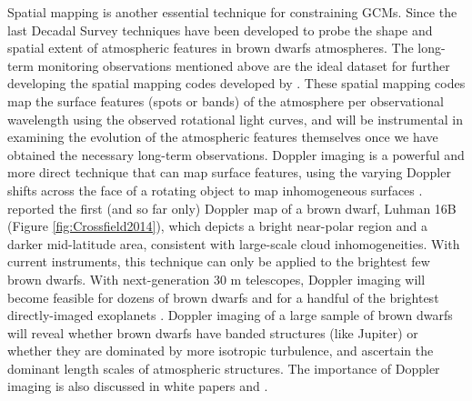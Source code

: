 \documentclass[12pt]{article}
\begin{document}
\begin{justify}
\noindent Spatial mapping is another essential technique for constraining GCMs. Since the last Decadal Survey techniques have been developed to probe the shape and spatial extent of atmospheric features in brown dwarfs atmospheres. The long-term monitoring observations mentioned above are the ideal dataset for further developing the spatial mapping codes developed by \citep{Karalidi2015, Karalidi2016, Apai2017a}. These spatial mapping codes map the surface features (spots or bands) of the atmosphere per observational wavelength using the observed rotational light curves, and will be instrumental in examining the evolution of the atmospheric features themselves once we have obtained the necessary long-term observations. 
\noindent Doppler imaging is a powerful and more direct technique that can map surface features, using the varying Doppler shifts across the face of a rotating object to map inhomogeneous surfaces \citep{Vogt1987}. \citep{Crossfield2014} reported the first (and so far only) Doppler map of a brown dwarf, Luhman 16B (Figure \ref{fig:Crossfield2014}), which depicts a bright near-polar region and a darker mid-latitude area, consistent with large-scale cloud inhomogeneities.  With current instruments, this technique can only be applied to the brightest few brown dwarfs. With next-generation 30 m telescopes, Doppler imaging will become feasible for dozens of brown dwarfs and for a handful of the brightest directly-imaged exoplanets \citep{Crossfield2014b}. Doppler imaging of a large sample of brown dwarfs will reveal whether brown dwarfs have banded structures (like Jupiter) or whether they are dominated by more isotropic turbulence, and ascertain the dominant length scales of atmospheric structures. The importance of Doppler imaging is also discussed in white papers \citep{Apai2019} and \citep{Burgasser2019}. %




\end{justify}
\end{document}
